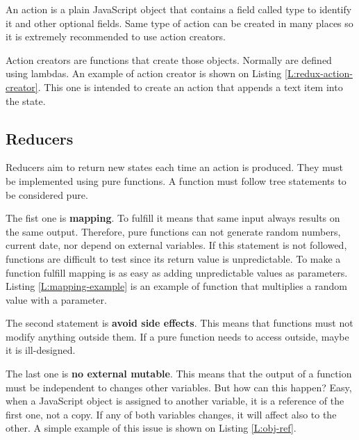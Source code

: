 An action is a plain JavaScript object that contains a field called type to 
identify it and other optional fields. Same type of action can be created in
many places so it is extremely recommended to use action creators.

Action creators are functions that create those objects. Normally are defined
using lambdas. An example of action creator is shown on Listing
\ref{L:redux-action-creator}. This one is intended to create an action that
appends a text item into the state.

\begin{codefigure}
\end{codefigure}

\subsection{Reducers}

Reducers aim to return new states each time an action is produced. They must be
implemented using pure functions. A function must follow tree statements to be 
considered pure.

The fist one is \textbf{mapping}. To fulfill it means that same input always 
results on the same output. Therefore, pure functions can not generate random
numbers, current date, nor depend on external variables. If this statement is
not followed, functions are difficult to test since its return value is
unpredictable. To make a function fulfill mapping is as easy as adding 
unpredictable values as parameters. Listing \ref{L:mapping-example} is an 
example of function that multiplies a random value with a parameter.

\begin{codefigure}
\end{codefigure}

The second statement is \textbf{avoid side effects}. This means that functions
must not modify anything outside them. If a pure function needs to access
outside, maybe it is ill-designed. 

\begin{codefigure}
\end{codefigure}

The last one is \textbf{no external mutable}. This means that the output of a
function must be independent to changes other variables. But how can this
happen? Easy, when a JavaScript object is assigned to another variable, it is a
reference of the first one, not a copy. If any of both variables changes, it
will affect also to the other. A simple example of this issue is shown on 
Listing \ref{L:obj-ref}.

